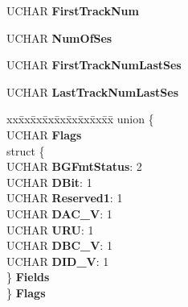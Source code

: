 \begin{DoxyCompactItemize}
\begin{tabbing}
\end{tabbing}\item 
\mbox{\label{struct___d_i_s_c___i_n_f_o___b_l_o_c_k_a4ddf91518cd1dd14f1de49b68243ac35}} 
U\+C\+H\+AR {\bfseries First\+Track\+Num}
\item 
\mbox{\label{struct___d_i_s_c___i_n_f_o___b_l_o_c_k_ab5b5dc4b01812ac05115b98726699ebc}} 
U\+C\+H\+AR {\bfseries Num\+Of\+Ses}
\item 
\mbox{\label{struct___d_i_s_c___i_n_f_o___b_l_o_c_k_a0f1f3623ef6444788e51e01ab557e7dc}} 
U\+C\+H\+AR {\bfseries First\+Track\+Num\+Last\+Ses}
\item 
\mbox{\label{struct___d_i_s_c___i_n_f_o___b_l_o_c_k_a0d4c4810aea6cc52997f231700111fe3}} 
U\+C\+H\+AR {\bfseries Last\+Track\+Num\+Last\+Ses}
\item 
\mbox{\label{struct___d_i_s_c___i_n_f_o___b_l_o_c_k_a76ffec5b23b87723a4c6e8d9a5092e30}} 
\begin{tabbing}
xx\=xx\=xx\=xx\=xx\=xx\=xx\=xx\=xx\=\kill
union \{\\
\>UCHAR {\bfseries Flags}\\
\>struct \{\\
\>\>UCHAR {\bfseries BGFmtStatus}: 2\\
\>\>UCHAR {\bfseries DBit}: 1\\
\>\>UCHAR {\bfseries Reserved1}: 1\\
\>\>UCHAR {\bfseries DAC\_V}: 1\\
\>\>UCHAR {\bfseries URU}: 1\\
\>\>UCHAR {\bfseries DBC\_V}: 1\\
\>\>UCHAR {\bfseries DID\_V}: 1\\
\>\} {\bfseries Fields}\\
\} {\bfseries Flags}\\


\end{tabbing}
\end{DoxyCompactItemize}
